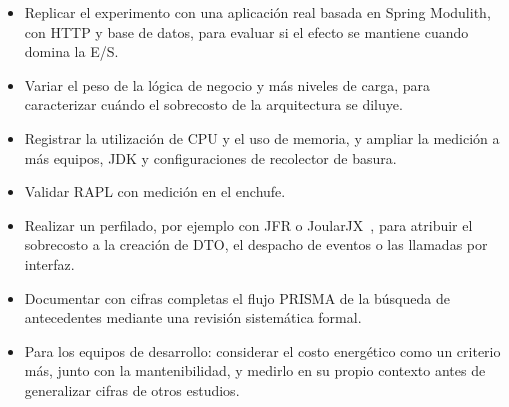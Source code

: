 \begin{itemize}
  \item Replicar el experimento con una aplicación real basada en Spring Modulith, con HTTP y base de datos, para evaluar si el efecto se mantiene cuando domina la E/S.
  \item Variar el peso de la lógica de negocio y más niveles de carga, para caracterizar cuándo el sobrecosto de la arquitectura se diluye.
  \item Registrar la utilización de CPU y el uso de memoria, y ampliar la medición a más equipos, JDK y configuraciones de recolector de basura.
  \item Validar RAPL con medición en el enchufe.
  \item Realizar un perfilado, por ejemplo con JFR o JoularJX~\cite{noureddine2022joular}, para atribuir el sobrecosto a la creación de DTO, el despacho de eventos o las llamadas por interfaz.
  \item Documentar con cifras completas el flujo PRISMA de la búsqueda de antecedentes mediante una revisión sistemática formal.
  \item Para los equipos de desarrollo: considerar el costo energético como un criterio más, junto con la mantenibilidad, y medirlo en su propio contexto antes de generalizar cifras de otros estudios.
\end{itemize}
